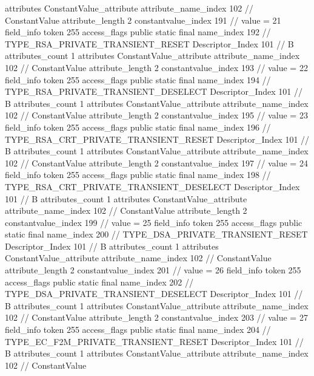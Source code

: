 {{{{{				attributes {
				ConstantValue_attribute {
					attribute_name_index	102		// ConstantValue
					attribute_length	2
					constantvalue_index	191		// value = 21
				}
				}
			}
			field_info {
				token	255
				access_flags	public static final
				name_index	192		// TYPE_RSA_PRIVATE_TRANSIENT_RESET
				Descriptor_Index	101		// B
				attributes_count	1
				attributes {
				ConstantValue_attribute {
					attribute_name_index	102		// ConstantValue
					attribute_length	2
					constantvalue_index	193		// value = 22
				}
				}
			}
			field_info {
				token	255
				access_flags	public static final
				name_index	194		// TYPE_RSA_PRIVATE_TRANSIENT_DESELECT
				Descriptor_Index	101		// B
				attributes_count	1
				attributes {
				ConstantValue_attribute {
					attribute_name_index	102		// ConstantValue
					attribute_length	2
					constantvalue_index	195		// value = 23
				}
				}
			}
			field_info {
				token	255
				access_flags	public static final
				name_index	196		// TYPE_RSA_CRT_PRIVATE_TRANSIENT_RESET
				Descriptor_Index	101		// B
				attributes_count	1
				attributes {
				ConstantValue_attribute {
					attribute_name_index	102		// ConstantValue
					attribute_length	2
					constantvalue_index	197		// value = 24
				}
				}
			}
			field_info {
				token	255
				access_flags	public static final
				name_index	198		// TYPE_RSA_CRT_PRIVATE_TRANSIENT_DESELECT
				Descriptor_Index	101		// B
				attributes_count	1
				attributes {
				ConstantValue_attribute {
					attribute_name_index	102		// ConstantValue
					attribute_length	2
					constantvalue_index	199		// value = 25
				}
				}
			}
			field_info {
				token	255
				access_flags	public static final
				name_index	200		// TYPE_DSA_PRIVATE_TRANSIENT_RESET
				Descriptor_Index	101		// B
				attributes_count	1
				attributes {
				ConstantValue_attribute {
					attribute_name_index	102		// ConstantValue
					attribute_length	2
					constantvalue_index	201		// value = 26
				}
				}
			}
			field_info {
				token	255
				access_flags	public static final
				name_index	202		// TYPE_DSA_PRIVATE_TRANSIENT_DESELECT
				Descriptor_Index	101		// B
				attributes_count	1
				attributes {
				ConstantValue_attribute {
					attribute_name_index	102		// ConstantValue
					attribute_length	2
					constantvalue_index	203		// value = 27
				}
				}
			}
			field_info {
				token	255
				access_flags	public static final
				name_index	204		// TYPE_EC_F2M_PRIVATE_TRANSIENT_RESET
				Descriptor_Index	101		// B
				attributes_count	1
				attributes {
				ConstantValue_attribute {
					attribute_name_index	102		// ConstantValue
}}}}}}}
